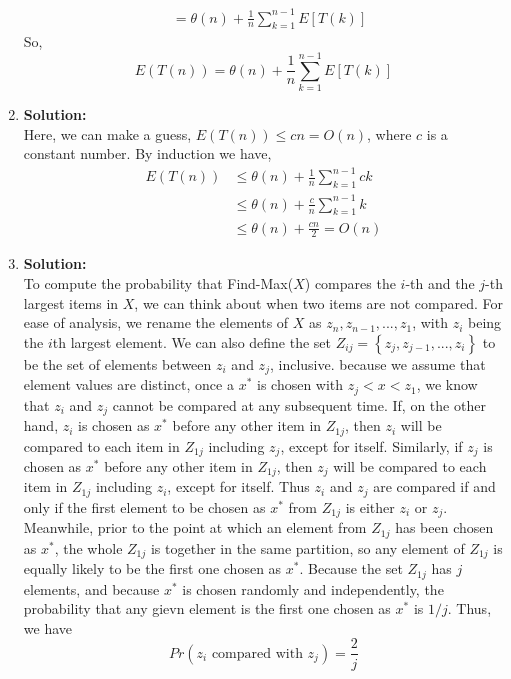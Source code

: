 \begin{enumerate}[label=(\alph*)]
\begin{align*}
		&= \theta(n) + \frac{1}{n}\sum_{k = 1}^{n - 1}E[T(k)]
		\end{align*}
		So,
		$$ E(T(n)) = \theta(n) + \frac{1}{n}\sum_{k = 1}^{n - 1}E[T(k)] $$
	\item 
		\textbf{Solution:} \\
		Here, we can make a guess, $E(T(n)) \leq cn = O(n)$, where $c$ is a constant number. 
		By induction we have,
		\begin{align*}
		E(T(n)) &\leq \theta(n) + \frac{1}{n}\sum_{k = 1}^{n - 1}ck\\
		&\leq \theta(n) + \frac{c}{n}\sum_{k = 1}^{n - 1}k\\
		&\leq \theta(n) + \frac{cn}{2} = O(n)
		\end{align*}

	\item 
		\textbf{Solution:} \\
		To compute the probability that Find-Max($X$) compares the $i$-th and the $j$-th largest items in $X$, we can think about when two items are not compared. For ease of analysis, we rename the elements of $X$ as $z_n, z_{n - 1}, ..., z_1$, with $z_i$ being the $i$th largest element. We can also define the set $Z_{ij} = \left\{ z_j, z_{j - 1}, ..., z_i\right\}$ to be the set of elements between $z_i$ and $z_j$, inclusive. because we assume that element values are distinct, once a $x^{*}$ is chosen with $z_j< x < z_1$, we know that $z_i$ and $z_j$ cannot be compared at any subsequent time. If, on the other hand, $z_i$ is chosen as $x^{*}$ before any other item in $Z_{1j}$, then $z_i$ will be compared to each item in $Z_{1j}$ including $z_j$, except for itself. Similarly, if $z_j$ is chosen as $x^{*}$ before any other item in $Z_{1j}$, then $z_j$ will be compared to each item in $Z_{1j}$ including $z_i$, except for itself. Thus $z_i$ and $z_j$ are compared if and only if the first element to be chosen as $x^{*}$ from $Z_{1j}$ is either $z_i$ or $z_j$. Meanwhile, prior to the point at which an element from $Z_{1j}$ has been chosen as $x^{*}$, the whole $Z_{1j}$ is together in the same partition, so any element of $Z_{1j}$ is equally likely to be the first one chosen as $x^{*}$. Because the set $Z_{1j}$ has $j$ elements, and because $x^{*}$ is chosen randomly and independently, the probability that any gievn element is the first one chosen as $x^{*}$ is $1/j$. Thus, we have
		$$ Pr(z_i \text{ compared with } z_j) = \frac{2}{j} $$
\end{enumerate}